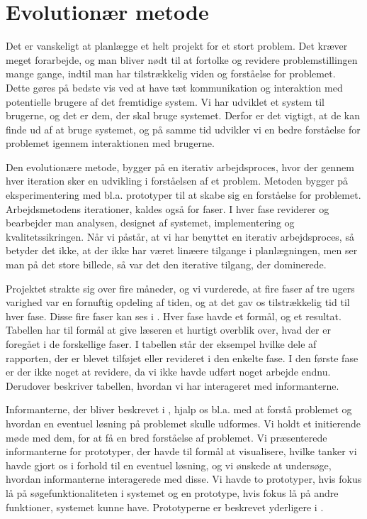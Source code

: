 \section{Evolutionær metode}
\label{sec:evolution}

Det er vanskeligt at planlægge et helt projekt for et stort problem. Det kræver meget forarbejde, og man bliver nødt til at fortolke og revidere problemstillingen mange gange, indtil man har tilstrækkelig viden og forståelse for problemet. Dette gøres på bedste vis ved at have tæt kommunikation og interaktion med potentielle brugere af det fremtidige system. Vi har udviklet et system til brugerne, og det er dem, der skal bruge systemet. Derfor er det vigtigt, at de kan finde ud af at bruge systemet, og på samme tid udvikler vi en bedre forståelse for problemet igennem interaktionen med brugerne. 

Den evolutionære metode, bygger på en iterativ arbejdsproces, hvor der gennem hver iteration sker en udvikling i forståelsen af et problem. Metoden bygger på eksperimentering med bl.a. prototyper til at skabe sig en forståelse for problemet. Arbejdsmetodens iterationer, kaldes også for faser. I hver fase reviderer og bearbejder man analysen, designet af systemet, implementering og kvalitetssikringen. \cite{cic} Når vi påstår, at vi har benyttet en iterativ arbejdsproces, så betyder det ikke, at der ikke har været linæere tilgange i planlægningen, men ser man på det store billede, så var det den iterative tilgang, der dominerede.

Projektet strakte sig over fire måneder, og vi vurderede, at fire faser af tre ugers varighed var en fornuftig opdeling af tiden, og at det gav os tilstrækkelig tid til hver fase. Disse fire faser kan ses i . Hver fase havde et formål, og et resultat. Tabellen har til formål at give læseren et hurtigt overblik over, hvad der er foregået i de forskellige faser. I tabellen står der eksempel hvilke dele af rapporten, der er blevet tilføjet eller revideret i den enkelte fase. I den første fase er der ikke noget at revidere, da vi ikke havde udført noget arbejde endnu. Derudover beskriver tabellen, hvordan vi har interageret med informanterne.

Informanterne, der bliver beskrevet i , hjalp os bl.a. med at forstå problemet og hvordan en eventuel løsning på problemet skulle udformes. Vi holdt et initierende møde med dem, for at få en bred forståelse af problemet. Vi præsenterede informanterne for prototyper, der havde til formål at visualisere, hvilke tanker vi havde gjort os i forhold til en eventuel løsning, og vi ønskede at undersøge, hvordan informanterne interagerede med disse. Vi havde to prototyper, hvis fokus lå på søgefunktionaliteten i systemet og en prototype, hvis fokus lå på andre funktioner, systemet kunne have. Prototyperne er beskrevet yderligere i . 



